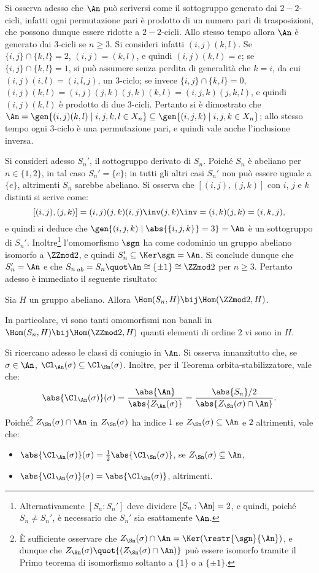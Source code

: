 \documentclass[12pt]{scrartcl}
\begin{document}
	
	Si osserva adesso che $\An$ può scriversi come il sottogruppo generato dai
	$2-2$-cicli, infatti ogni permutazione pari è prodotto di un numero pari di trasposizioni,
	che possono dunque essere ridotte a $2-2$-cicli. Allo stesso tempo allora
	$\An$ è generato dai $3$-cicli se $n \geq 3$. Si consideri infatti $(i, j)(k, l)$. Se
	$\{i, j\} \cap \{k, l\} = 2$, $(i, j) = (k, l)$, e quindi $(i, j)(k, l) = e$;
	se $\{i, j\} \cap \{k, l\} = 1$, si può assumere senza perdita di generalità che
	$k = i$, da cui $(i, j)(i, l) = (i, l, j)$, un $3$-ciclo; se invece $\{i, j\} \cap \{k, l\} = 0$,
	$(i, j)(k, l) = (i, j)(j, k)(j, k)(k, l) = (i, j, k)(j, k, l)$, e quindi
	$(i, j)(k, l)$ è prodotto di due $3$-cicli. Pertanto si è dimostrato
	che $\An = \gen{(i, j)(k, l) \mid i, j, k, l \in X_n} \subseteq \gen{(i, j, k) \mid i, j, k \in X_n}$; allo stesso tempo ogni $3$-ciclo è una permutazione
	pari, e quindi vale anche l'inclusione inversa. \medskip
	
	
	
	Si consideri adesso $S_n'$, il sottogruppo derivato di $S_n$. Poiché $S_n$ è abeliano
	per $n \in \{ 1, 2 \}$, in tal caso $S_n' = \{e\}$; in tutti gli altri casi
	$S_n'$ non può essere uguale a $\{e\}$, altrimenti $S_n$ sarebbe abeliano. Si osserva
	che $[(i,j), (j,k)]$ con $i$, $j$ e $k$ distinti si scrive come:
	\[ [(i,j), (j,k)] = (i, j) (j, k) (i, j)\inv (j, k)\inv = (i, k) (j, k) = (i, k, j), \]
	e quindi si deduce che $\gen{(i, j, k) \mid \abs{\{i, j, k\}} = 3} = \An$ è un sottogruppo
	di $S_n'$. Inoltre\footnote{
		Alternativamente $[S_n : S_n']$ deve dividere $[S_n : \An] = 2$, e quindi,
		poiché $S_n \neq S_n'$, è necessario che $S_n'$ sia esattamente $\An$.
	} l'omomorfismo $\sgn$ ha come codominio un gruppo abeliano isomorfo
	a $\ZZmod2$, e quindi $S_n' \subseteq \Ker \sgn = \An$. Si conclude dunque che
	$S_n' = \An$ e che ${S_n}_{\,ab} = S_n \quot \An \cong \{\pm 1\} \cong \ZZmod2$ per $n \geq 3$. Pertanto adesso è immediato il seguente risultato:
	
	\begin{proposition}
		Sia $H$ un gruppo abeliano. Allora $\Hom(S_n, H) \bij \Hom(\ZZmod2, H)$.
	\end{proposition}

	In particolare, vi sono tanti omomorfismi non banali in $\Hom(S_n, H) \bij \Hom(\ZZmod2, H)$ quanti elementi di ordine $2$ vi sono in $H$. \bigskip
	
	
	Si ricercano adesso le classi di coniugio in $\An$. Si osserva innanzitutto che,
	se $\sigma \in \An$, $\Cl_{\An}(\sigma) \subseteq \Cl_{\Sn}(\sigma)$. Inoltre,
	per il Teorema orbita-stabilizzatore, vale che:
	\[ \abs{\Cl_{\An}(\sigma)}(\sigma) = \frac{\abs{\An}}{\abs{Z_{\An}(\sigma)}} =
	\frac{\abs{S_n}/2}{\abs{Z_{\Sn}(\sigma) \cap \An}}. \]
	Poiché\footnote{
		È sufficiente osservare che $Z_{\Sn}(\sigma) \cap \An = \Ker(\restr{\sgn}{\An})$,
		e dunque che $Z_{\Sn}(\sigma) \quot{(Z_{\Sn}(\sigma) \cap \An)}$ può essere
		isomorfo tramite il Primo teorema di isomorfismo soltanto a $\{1\}$ o
		a $\{\pm1\}$.
	} $Z_{\Sn}(\sigma) \cap \An$ in $Z_{\Sn}(\sigma)$ ha indice $1$ se
	$Z_{\Sn}(\sigma) \subseteq \An$ e $2$ altrimenti, vale che:
	
	\begin{itemize}
		\item $\abs{\Cl_{\An}(\sigma)}(\sigma) = \frac{1}{2} \abs{\Cl_{\Sn}(\sigma)}$, se $Z_{\Sn}(\sigma) \subseteq \An$,
		\item $\abs{\Cl_{\An}(\sigma)}(\sigma) = \abs{\Cl_{\Sn}(\sigma)}$, altrimenti.
	\end{itemize}
\end{document}
